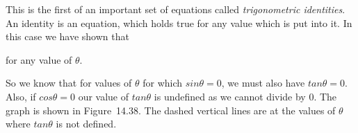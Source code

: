         \label{m39414*id89965}This is the first of an important set of equations called \textsl{trigonometric identities}. An identity is an equation, which holds true for any value which is put into it. In this case we have shown that\par 
        \label{m39414*id89978}\nopagebreak\noindent{}
        \label{m39414*id90014}for any value of $\theta $.\par 
        \label{m39414*id90030}So we know that for values of $\theta $ for which $sin\theta =0$, we must also have $tan\theta =0$. Also, if $cos\theta =0$ our value of $tan\theta $ is undefined as we cannot divide by 0. The graph is shown in Figure~14.38. The dashed vertical lines are at the values of $\theta $ where $tan\theta $ is not defined.\par 
    \setcounter{subfigure}{0}
